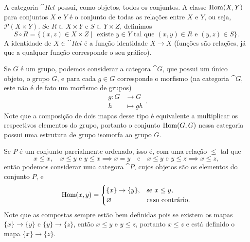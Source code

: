 \begin{exemplo}
    A categoria $\cat{Rel}$ possui, como objetos, todos os conjuntos. A classe $\operatorname{Hom}(X,Y)$ para conjuntos $X$ e $Y$ é o conjunto de todas as relações entre $X$ e $Y$, ou seja, $\mathcal{P}(X \times Y)$. Se $R \subset X \times Y$ e $S \subset Y \times Z$, definimos \begin{equation}
        S \circ R = \{(x,z) \in X \times Z \mid \text{ existe } y \in Y \text{ tal que } (x,y) \in R \text{ e } (y,z) \in S\}.
    \end{equation} A identidade de $X \in \cat{Rel}$ é a função identidade $X \to X$ (funções são relações, já que a qualquer função corresponde o seu gráfico).
\end{exemplo}

\begin{exemplo}
    Se $G$ é um grupo, podemos considerar a categora $\cat{G}$, que possui um único objeto, o grupo $G$, e para cada $g \in G$ corresponde o morfismo (na categoria $\cat{G}$, este não é de fato um morfismo de grupos) \begin{equation}
        \begin{split}
            g \colon G &\to G \\ h &\mapsto gh
        \end{split}.
    \end{equation} Note que a composição de dois mapas desse tipo é equivalente a multiplicar os respectivos elementos do grupo, portanto o conjunto $\operatorname{Hom}(G,G)$ nessa categoria possui uma estrutura de grupo isomorfa ao grupo $G$.
\end{exemplo}

\begin{exemplo}
    Se $P$ é um conjunto parcialmente ordenado, isso é, com uma relação $\leq$ tal que \begin{equation}
        x \leq x, \quad x \leq y \text{ e } y \leq x \implies x = y \quad \text{e} \quad x \leq y \text{ e } y \leq z \implies x \leq z,
    \end{equation} então podemos considerar uma categora $\cat{P}$, cujos objetos são os elementos do conjunto $P$, e \begin{equation}
        \operatorname{Hom}(x,y) = \begin{cases}
            \{x\} \to \{y\}, &\text{se } x \leq y, \\ \varnothing &\text{caso contrário}.
        \end{cases}
    \end{equation} Note que as compostas sempre estão bem definidas pois se existem os mapas $\{x\} \to \{y\}$ e $\{y\} \to \{z\}$, então $x \leq y$ e $y \leq z$, portanto $x \leq z$ e está definido o mapa $\{x\} \to \{z\}$.
\end{exemplo}

